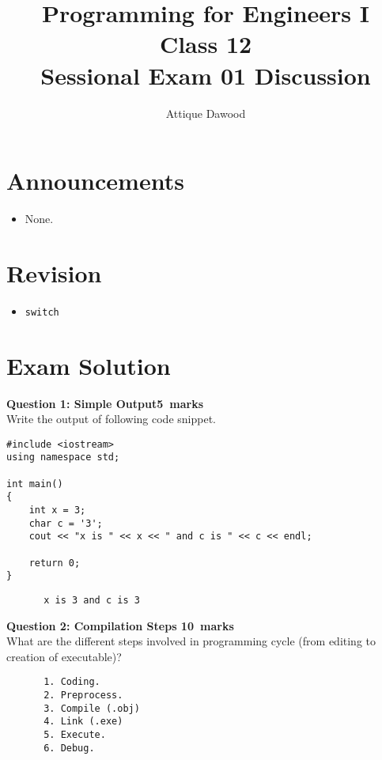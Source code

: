 \documentclass[12pt,a4paper]{article}
\title{\vspace{-2cm}Programming for Engineers I\\Class 12\\Sessional Exam 01 Discussion}
\author{Attique Dawood}
\def\QOne{5}
\def\Qtwo{10}
\begin{document}
\maketitle
\section{Announcements}
\begin{itemize}
\item None.
\end{itemize}
\section{Revision}
\begin{itemize}
\item \verb|switch|
\end{itemize}
\section{Exam Solution}
\noindent\textbf{Question 1: Simple Output\hfill \QOne~marks}\\
Write the output of following code snippet.
\begin{lstlisting}
#include <iostream>
using namespace std;

int main()
{
	int x = 3;
	char c = '3';
	cout << "x is " << x << " and c is " << c << endl;
	
	return 0;
}
\end{lstlisting}
\begin{figure}[H]
\begin{lstlisting}
 x is 3 and c is 3
\end{lstlisting}
\vspace{-1cm}
\end{figure}

\noindent\textbf{Question 2: Compilation Steps \hfill \Qtwo~marks}\\
What are the different steps involved in programming cycle (from editing to creation of executable)? 
\begin{figure}[H]
\begin{lstlisting}
 1. Coding.
 2. Preprocess.
 3. Compile (.obj)
 4. Link (.exe)
 5. Execute.
 6. Debug.
\end{lstlisting}
\vspace{-3.25cm}
\end{figure}
\end{document}
